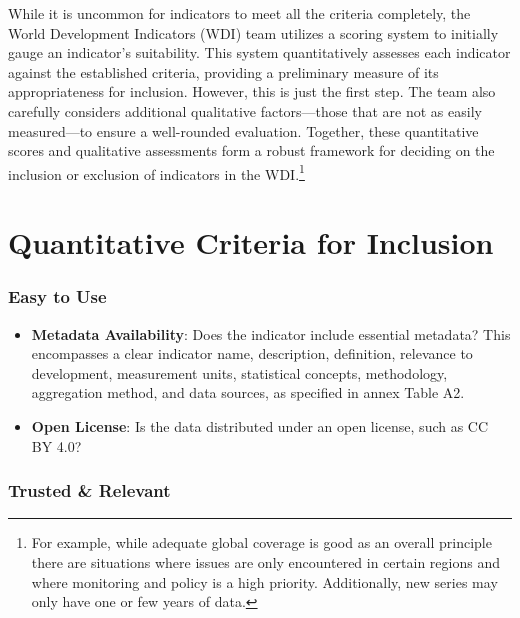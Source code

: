 \documentclass[
  11pt,
  a4paper,
  DIV=11,
  numbers=noendperiod]{scrreprt}
\providecommand{\tightlist}{%
  \setlength{\itemsep}{0pt}\setlength{\parskip}{0pt}}\usepackage{longtable,booktabs,array}
\begin{document}
While it is uncommon for indicators to meet all the criteria completely,
the World Development Indicators (WDI) team utilizes a scoring system to
initially gauge an indicator's suitability. This system quantitatively
assesses each indicator against the established criteria, providing a
preliminary measure of its appropriateness for inclusion. However, this
is just the first step. The team also carefully considers additional
qualitative factors---those that are not as easily measured---to ensure
a well-rounded evaluation. Together, these quantitative scores and
qualitative assessments form a robust framework for deciding on the
inclusion or exclusion of indicators in the WDI.\footnote{For example,
  while adequate global coverage is good as an overall principle there
  are situations where issues are only encountered in certain regions
  and where monitoring and policy is a high priority. Additionally, new
  series may only have one or few years of data.}

\section{Quantitative Criteria for
Inclusion}\label{quantitative-criteria-for-inclusion}

\subsubsection*{\texorpdfstring{\textbf{Easy to
Use}}{Easy to Use}}\label{easy-to-use}

\begin{itemize}
\tightlist
\item
  \textbf{Metadata Availability}: Does the indicator include essential
  metadata? This encompasses a clear indicator name, description,
  definition, relevance to development, measurement units, statistical
  concepts, methodology, aggregation method, and data sources, as
  specified in annex Table A2.
\item
  \textbf{Open License}: Is the data distributed under an open license,
  such as CC BY 4.0?
\end{itemize}

\subsubsection*{\texorpdfstring{\textbf{Trusted \&
Relevant}}{Trusted \& Relevant}}\label{trusted-relevant}
\end{document}
